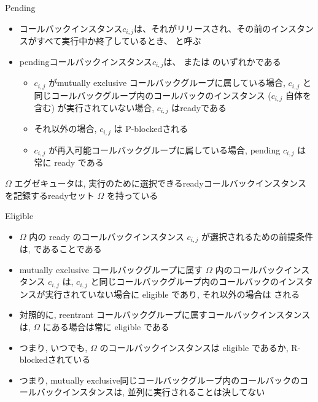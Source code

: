 \begin{frame}{Pending}


    \begin{itemize}
        \item コールバックインスタンス$c_{i, j}$は、それがリリースされ、その前のインスタンスがすべて実行中か終了しているとき、 と呼ぶ
        \item pendingコールバックインスタンス$c_{i, j}$は、 または のいずれかである
              \begin{itemize}
                  \item  $c_{i, j}$ がmutually exclusive コールバックグループに属している場合, $c_{i, j}$ と同じコールバックグループ内のコールバックのインスタンス ($c_{i, j}$ 自体を含む) が実行されていない場合, $c_{i, j}$ はreadyである
                  \item それ以外の場合, $c_{i, j}$ は P-blockedされる

                  \item  $c_{i, j}$ が再入可能コールバックグループに属している場合, pending $c_{i, j}$ は常に ready である
              \end{itemize}
    \end{itemize}
\end{frame}

\begin{frame}{$\Omega$}
    エグゼキュータは, 実行のために選択できるreadyコールバックインスタンスを記録するreadyセット $\Omega$ を持っている
\end{frame}

\begin{frame}{Eligible}
    \begin{itemize}
        \item $\Omega$ 内の ready のコールバックインスタンス $c_{i, j}$ が選択されるための前提条件は,  であることである
        \item mutually exclusive コールバックグループに属す $\Omega$ 内のコールバックインスタンス $c_{i, j}$ は, $c_{i, j}$ と同じコールバックグループ内のコールバックのインスタンスが実行されていない場合に eligible であり, それ以外の場合は  される
        \item 対照的に, reentrant コールバックグループに属すコールバックインスタンスは, $\Omega$ にある場合は常に eligible である
        \item つまり, いつでも, $\Omega$ のコールバックインスタンスは eligible であるか, R-blockedされている
        \item つまり, mutually exclusive同じコールバックグループ内のコールバックのコールバックインスタンスは, 並列に実行されることは決してない
    \end{itemize}
\end{frame}

